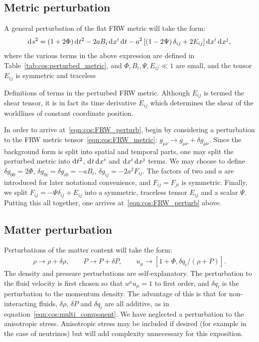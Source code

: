\subsection{Metric perturbation}
A general perturbation of the flat FRW metric will take the form:
\begin{equation}
  \operatorname{d}^{}\!{s}^2 = (1+2\Phi)\operatorname{d}^{}\!{t}^2 -2a B_i \operatorname{d}^{}\!{x}^i \operatorname{d}^{}\!{t}  -a^2 \left[ \left( 1 - 2 \Psi \right)\delta_{ij} + 2E_{ij} \right] \operatorname{d}^{}\!{x}^i \operatorname{d}^{}\!{x}^j,
  \label{eqn:cos:FRW_perturb}
\end{equation}
where the various terms in the above expression are defined in Table~\ref{tab:cos:perturbed_metric}, and \({\Phi,B_i,\Psi,E_{ij}\ll1}\) are small, and the tensor \(E_{ij}\) is symmetric and traceless
\begin{table}[tp]
  \centering
  
  \caption{Definitions of terms in the perturbed FRW metric. Although \(E_{ij}\) is termed the shear tensor, it is in fact its time derivative \(\dot{E}_{ij}\) which determines the shear of the worldlines of constant coordinate position.}\label{tab:cos:perturbed_metric}
\end{table}

In order to arrive at~\eqref{eqn:cos:FRW_perturb}, begin by considering a perturbation to the FRW metric tensor~\eqref{eqn:cos:FRW_metric}: \({g_{\mu\nu} \rightarrow g_{\mu\nu} + \delta g_{\mu\nu}}\). Since the background form is split into spatial and temporal parts, one may split the perturbed metric into \(\operatorname{d}^{}\!{t}^2\), \(\operatorname{d}^{}\!{t}\operatorname{d}^{}\!{x^i}\) and \(\operatorname{d}^{}\!{x^i}\operatorname{d}^{}\!{x^j}\) terms. We may choose to define \({\delta g_{00} = 2\Phi}\), \({\delta g_{0i} = \delta g_{i0} = -a B_i}\), \({\delta g_{ij} = -2a^2F_{ij}}\). The factors of two and \(a\) are introduced for later notational convenience, and \({F_{ij} = F_{ji}}\) is symmetric. Finally, we split \({F_{ij} = -\Psi\delta_{ij} + E_{ij}}\) into a symmetric, traceless tensor \(E_{ij}\) and a scalar \(\Psi\). Putting this all together, one arrives at~\eqref{eqn:cos:FRW_perturb} above.

\subsection{Matter perturbation}
Perturbations of the matter content will take the form:
\begin{align}
  \rho \rightarrow \rho + \delta \rho, \qquad 
  P \rightarrow P + \delta P, \qquad
  u_\mu \rightarrow \left[ 1+\Phi, \delta q_i/(\rho+P)\right].
  \label{eqn:cos:matter_perturb}
\end{align}
The density and pressure perturbations are self-explanatory. The perturbation to the fluid velocity is first chosen so that \(u^\mu u_\mu=1\) to first order, and \(\delta q_i\) is the perturbation to the momentum density. The advantage of this is that for non-interacting fluids, \(\delta\rho\), \(\delta P\) and \(\delta q_i\) are all additive, as in equation~\eqref{eqn:cos:multi_component}. We have neglected a perturbation to the anisotropic stress. Anisotropic stress may be included if desired (for example in the case of neutrinos) but will add complexity unnecessary for this exposition. 

